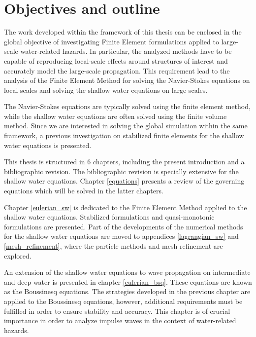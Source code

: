 \section{Objectives and outline}


The work developed within the framework of this thesis can be enclosed in the global objective of investigating Finite Element formulations applied to large-scale water-related hazards. In particular, the analyzed methods have to be capable of reproducing local-scale effects around structures of interest and accurately model the large-scale propagation. This requirement lead to the analysis of the Finite Element Method for solving the Navier-Stokes equations on local scales and solving the shallow water equations on large scales.

The Navier-Stokes equations are typically solved using the finite element method, while the shallow water equations are often solved using the finite volume method.
Since we are interested in solving the global simulation within the same framework, a previous investigation on stabilized finite elements for the shallow water equations is presented.


This thesis is structured in 6 chapters, including the present introduction and a bibliographic revision. The bibliographic revision is specially extensive for the shallow water equations.
Chapter \ref{equations} presents a review of the governing equations which will be solved in the latter chapters.

Chapter \ref{eulerian_sw} is dedicated to the Finite Element Method applied to the shallow water equations. Stabilized formulations and quasi-monotonic formulations are presented.
Part of the developments of the numerical methods for the shallow water equations are moved to appendices \ref{lagrangian_sw} and \ref{mesh_refinement}, where the particle methods and mesh refinement are explored.

An extension of the shallow water equations to wave propagation on intermediate and deep water is presented in chapter \ref{eulerian_bsq}. These equations are known as the Boussinesq equations. The strategies developed in the previous chapter are applied to the Boussinesq equations, however, additional requirements must be fulfilled in order to ensure stability and accuracy. This chapter is of crucial importance in order to analyze impulse waves in the context of water-related hazards.

